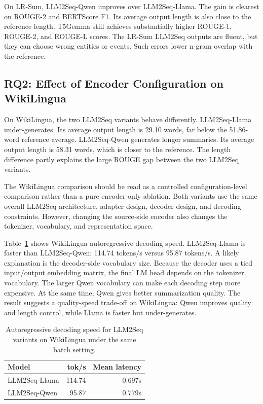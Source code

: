 \documentclass[11pt]{article}
\begin{document}
On LR-Sum, LLM2Seq-Qwen improves over LLM2Seq-Llama.
The gain is clearest on ROUGE-2 and BERTScore F1.
Its average output length is also close to the reference length.
T5Gemma still achieves substantially higher ROUGE-1, ROUGE-2, and ROUGE-L scores.
The LR-Sum LLM2Seq outputs are fluent, but they can choose wrong entities or events.
Such errors lower n-gram overlap with the reference.

\subsection{RQ2: Effect of Encoder Configuration on WikiLingua}

On WikiLingua, the two LLM2Seq variants behave differently.
LLM2Seq-Llama under-generates.
Its average output length is 29.10 words, far below the 51.86-word reference average.
LLM2Seq-Qwen generates longer summaries.
Its average output length is 58.31 words, which is closer to the reference.
The length difference partly explains the large ROUGE gap between the two LLM2Seq variants.

The WikiLingua comparison should be read as a controlled configuration-level comparison rather than a pure encoder-only ablation.
Both variants use the same overall LLM2Seq architecture, adapter design, decoder design, and decoding constraints.
However, changing the source-side encoder also changes the tokenizer, vocabulary, and representation space.

Table~\ref{tab:speed} shows WikiLingua autoregressive decoding speed.
LLM2Seq-Llama is faster than LLM2Seq-Qwen: 114.74 tokens/s versus 95.87 tokens/s.
A likely explanation is the decoder-side vocabulary size.
Because the decoder uses a tied input/output embedding matrix, the final LM head depends on the tokenizer vocabulary.
The larger Qwen vocabulary can make each decoding step more expensive.
At the same time, Qwen gives better summarization quality.
The result suggests a quality-speed trade-off on WikiLingua: Qwen improves quality and length control, while Llama is faster but under-generates.

\begin{table}[t]
\centering
\small
\begin{tabular}{lrr}
\toprule
Model & tok/s & Mean latency \\
\midrule
LLM2Seq-Llama & 114.74 & 0.697s \\
LLM2Seq-Qwen & 95.87 & 0.779s \\
\bottomrule
\end{tabular}
\caption{Autoregressive decoding speed for LLM2Seq variants on WikiLingua under the same batch setting.}
\label{tab:speed}
\end{table}
\end{document}
